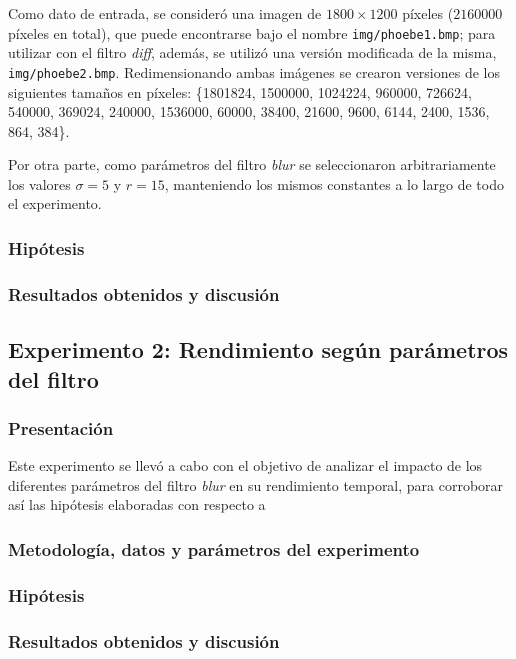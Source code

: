         	Como dato de entrada, se consideró una imagen de $1800 \times 1200$ píxeles ($2160000$ píxeles en total), que puede encontrarse bajo el nombre \texttt{img/phoebe1.bmp}; para utilizar con el filtro \emph{diff}, además, se utilizó una versión modificada de la misma, \texttt{img/phoebe2.bmp}. Redimensionando ambas imágenes se crearon versiones de los siguientes tamaños en píxeles: \{1801824, 1500000, 1024224, 960000, 726624, 540000, 369024, 240000, 1536000, 60000, 38400, 21600, 9600, 6144, 2400, 1536, 864, 384\}.

        	Por otra parte, como parámetros del filtro \emph{blur} se seleccionaron arbitrariamente los valores $\sigma = 5$ y $r = 15$, manteniendo los mismos constantes a lo largo de todo el experimento.

        \subsubsection*{Hipótesis}

        \subsubsection*{Resultados obtenidos y discusión}

    \subsection{Experimento 2: Rendimiento según parámetros del filtro }

        \subsubsection*{Presentación}
            Este experimento se llevó a cabo con el objetivo de analizar el impacto de los diferentes parámetros del filtro \emph{blur} en su rendimiento temporal, para corroborar así las hipótesis elaboradas con respecto a 

        \subsubsection*{Metodología, datos y parámetros del experimento}

        \subsubsection*{Hipótesis}

        \subsubsection*{Resultados obtenidos y discusión}

